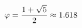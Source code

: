 \documentclass[preview]{standalone}
\begin{document}
\begin{align*}
\special{dvisvgm:raw <g id='unique000'>}\varphi = \frac{1+\sqrt{5}}{2} \approx 1.618\special{dvisvgm:raw </g>}
\end{align*}
\end{document}
